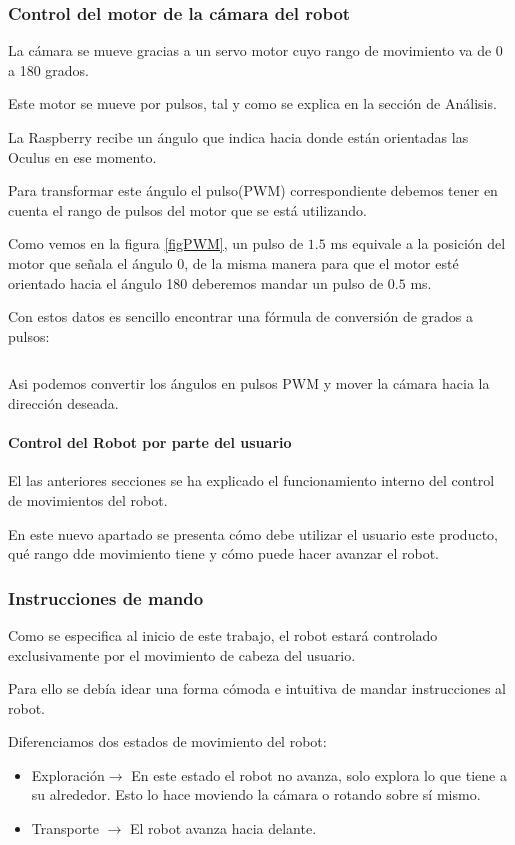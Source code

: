 \documentclass[twoside, 12pt]{epstfg}
\begin{document}
\subsubsection{\textbf{Control del motor de la cámara del robot}}

La cámara se mueve gracias a un servo motor cuyo rango de movimiento va de 0 a 180 grados.

Este motor se mueve por pulsos, tal y como se explica en la sección de Análisis.

La Raspberry recibe un ángulo que indica hacia donde están orientadas las Oculus en ese momento.

Para transformar este ángulo el pulso(PWM) correspondiente debemos tener en cuenta el rango de pulsos del motor que se está utilizando.

Como vemos en la figura \ref{figPWM}, un pulso de $1.5$ ms equivale a la posición del motor que señala el ángulo 0, de la misma manera para que el motor esté orientado hacia el ángulo 180 deberemos mandar un pulso de $0.5$ ms.

Con estos datos es sencillo encontrar una fórmula de conversión de grados a pulsos:

$$$$

Asi podemos convertir los ángulos en pulsos PWM y mover la cámara hacia la dirección deseada.

\paragraph{Control del Robot por parte del usuario}

El las anteriores secciones se ha explicado el funcionamiento interno del control de movimientos del robot.

En este nuevo apartado se presenta cómo debe utilizar el usuario este producto, qué rango dde movimiento tiene y cómo puede hacer avanzar el robot.

\subsubsection{\textbf{Instrucciones de mando}}

Como se especifica al inicio de este trabajo, el robot estará controlado exclusivamente por el movimiento de cabeza del usuario.

Para ello se debía idear una forma cómoda e intuitiva de mandar instrucciones al robot.

Diferenciamos dos estados de movimiento del robot:
\begin{itemize}
	\item Exploración$\rightarrow$ En este estado el robot no avanza, solo explora lo que tiene a su alrededor. Esto lo hace moviendo la cámara o rotando sobre sí mismo.
	\item Transporte $\rightarrow$ El robot avanza hacia delante.
\end{itemize}
\end{document}
